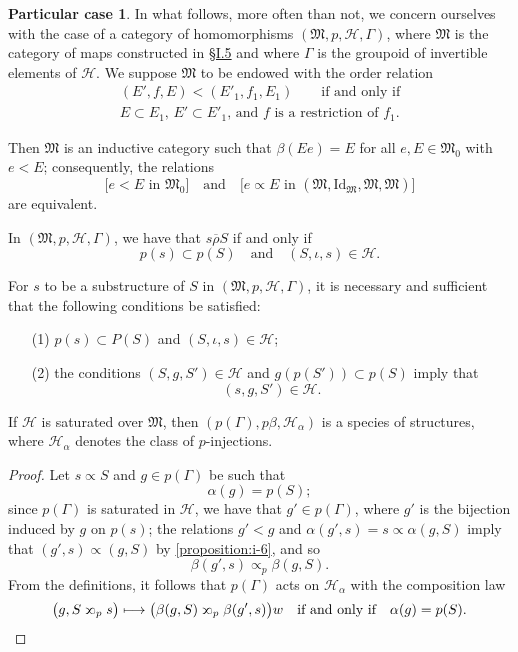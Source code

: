 \documentclass[a4paper,fleqn]{article}
\theoremstyle{plain}
\newenvironment{proposition}[1]
  {\renewcommand\theinnerproposition{#1}\innerproposition}
  {\endinnerproposition}
\theoremstyle{definition}
\newtheorem*{particular}{Particular case}
\newcommand{\oldpage}[1]{{\marginpar{\footnotesize$\bigg\vert$\,\,\,\,\textit{p.~#1}}}}
\newcommand{\textand}{\quad\text{and}\quad}
\newcommand{\HH}{\mathcal{H}}
\newcommand{\MM}{\mathfrak{M}}
\newcommand{\relrhobar}{\mathrel{\overline{\rho}}}
\newcommand{\subs}{\mathrel{\propto}}
\newcommand{\sups}{\mathrel{\reflectbox{$\propto$}}}
\newcommand{\Id}{\mathrm{Id}}
\begin{document}
\begin{particular}
  In what follows, more often than not, we concern ourselves with the case of a category of homomorphisms $(\MM,p,\HH,\Gamma)$, where $\MM$ is the category of maps constructed in \hyperref[section:i.5]{§I.5} and where $\Gamma$ is the groupoid of invertible elements of $\HH$.
  We suppose $\MM$ to be endowed with the order relation
  \[
    \begin{gathered}
      (E',f,E) < (E'_1,f_1,E_1)
      \qquad\text{if and only if}
    \\\text{$E\subset E_1$, $E'\subset E'_1$, and $f$ is a restriction of $f_1$.}
    \end{gathered}
  \]

  Then $\MM$ is an inductive category such that $\beta(Ee)=E$ for all $e,E\in\MM_0$ with $e<E$;
  consequently, the relations
  \[
    \big[\text{$e<E$ in $\MM_0$}\big]
    \textand
    \big[\text{$e\subs E$ in $(\MM,\Id_\MM,\MM,\MM)$}\big]
  \]
  are equivalent.

  In $(\MM,p,\HH,\Gamma)$, we have that $s\relrhobar S$ if and only if
  \[
    p(s)\subset p(S)
    \textand
    (S,\iota,s)\in\HH.
  \]

  For $s$ to be a substructure of $S$ in $(\MM,p,\HH,\Gamma)$, it is necessary and sufficient that the following conditions be satisfied:
  \begin{enumerate}
    \item[\normalfont(1)]
      $p(s)\subset P(S)$ and $(S,\iota,s)\in\HH$;
    \item[\normalfont(2)]
      the conditions $(S,g,S')\in\HH$ and $g(p(S'))\subset p(S)$ imply that
      \[
        (s,g,S')\in\HH.
      \]
  \end{enumerate}
\end{particular}

\begin{proposition}{15}
  If $\HH$ is saturated over $\MM$, then $(p(\Gamma),p\beta,\HH_\alpha)$ is a species of structures, where $\HH_\alpha$ denotes the class of $p$-injections.
\end{proposition}

\begin{proof}
  Let $s\subs S$ and $g\in p(\Gamma)$ be such that
  \[
    \alpha(g)
    = p(S);
  \]
  since $p(\Gamma)$ is saturated in $\HH$, we have that $g'\in p(\Gamma)$, where $g'$ is the bijection induced by $g$ on $p(s)$;
  the relations $g'<g$ and $\alpha(g',s)=s\subs\alpha(g,S)$ imply that $(g',s)\subs(g,S)$ by \cref{proposition:i-6}, and so
  \[
    \beta(g',s)
    \subs_p \beta(g,S).
  \]
  \oldpage{380}
  From the definitions, it follows that $p(\Gamma)$ acts on $\HH_\alpha$ with the composition law
  \[
    \big(
      g, S\sups_p s
    \big)
    \longmapsto
    \big(
      \beta(g,S) \sups_p \beta(g',s)
    \big)w
    \quad\text{if and only if}\quad
    \alpha(g)=p(S).
    \qedhere
  \]
\end{proof}
\end{document}
